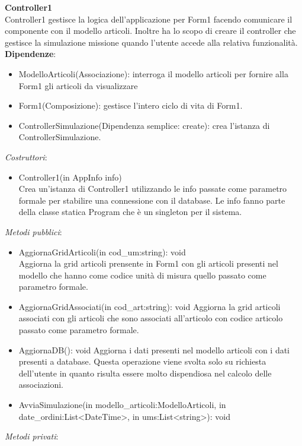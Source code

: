\textbf{Controller1}\\
Controller1 gestisce la logica dell'applicazione per Form1 facendo comunicare il componente con il modello articoli.
Inoltre ha lo scopo di creare il controller che gestisce la simulazione missione quando l'utente accede alla relativa funzionalità.
\textbf{Dipendenze}:
\begin{itemize}
    \item ModelloArticoli(Associazione): interroga il modello articoli per fornire alla Form1 gli articoli da visualizzare\\
    \item Form1(Composizione): gestisce l'intero ciclo di vita di Form1.
    \item ControllerSimulazione(Dipendenza semplice: create): crea l'istanza di ControllerSimulazione.
\end{itemize}
\textit{Costruttori}:\\
\begin{itemize}
    \item Controller1(in AppInfo info)\\
    Crea un'istanza di Controller1 utilizzando le info passate come parametro formale per stabilire una connessione con il database.
    Le info fanno parte della classe statica Program che è un singleton per il sistema.
\end{itemize}
\textit{Metodi pubblici}:\\
\begin{itemize}
    \item AggiornaGridArticoli(in cod\_um:string): void\\
    Aggiorna la grid articoli prensente in Form1 con gli articoli presenti nel modello che hanno come codice unità di misura quello passato come parametro formale.
    \item AggiornaGridAssociati(in cod\_art:string): void
    Aggiorna la grid articoli associati con gli articoli che sono associati all'articolo con codice articolo passato come parametro formale.
    \item AggiornaDB(): void
    Aggiorna i dati presenti nel modello  articoli con i dati presenti a database.
    Questa operazione viene svolta solo su richiesta dell'utente in quanto risulta essere molto dispendiosa nel calcolo delle associazioni.
    \item AvviaSimulazione(in modello\_articoli:ModelloArticoli, in date\_ordini:List<DateTime>, in ums:List<string>): void
\end{itemize} 
\textit{Metodi privati}:\\
